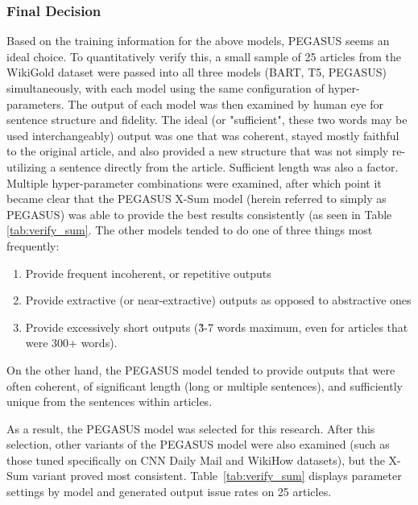 \documentclass[12pt]{report}
\begin{document}
        \subsubsection{Final Decision}
        Based on the training information for the above models, PEGASUS seems an ideal choice. To quantitatively verify this, a small sample of 25 articles from the WikiGold dataset were passed into all three models (BART, T5, PEGASUS) simultaneously, with each model using the same configuration of hyper-parameters. The output of each model was then examined by human eye for sentence structure and fidelity. The ideal (or "sufficient", these two words may be used interchangeably) output was one that was coherent, stayed mostly faithful to the original article, and also provided a new structure that was not simply re-utilizing a sentence directly from the article. Sufficient length was also a factor. Multiple hyper-parameter combinations were examined, after which point it became clear that the PEGASUS X-Sum model (herein referred to simply as PEGASUS) was able to provide the best results consistently (as seen in Table \ref{tab:verify_sum}. The other models tended to do one of three things most frequently:
        
        \begin{enumerate}
            \item Provide frequent incoherent, or repetitive outputs
            \item Provide extractive (or near-extractive) outputs as opposed to abstractive ones
            \item Provide excessively short outputs (\~3-7 words maximum, even for articles that were 300+ words).
        \end{enumerate}
        
        On the other hand, the PEGASUS model tended to provide outputs that were often coherent, of significant length (long or multiple sentences), and sufficiently unique from the sentences within articles.
        
        As a result, the PEGASUS model was selected for this research. After this selection, other variants of the PEGASUS model were also examined (such as those tuned specifically on CNN Daily Mail and WikiHow datasets), but the X-Sum variant proved most consistent. Table~\ref{tab:verify_sum} displays parameter settings by model and generated output issue rates on 25 articles.
        
\end{document}
